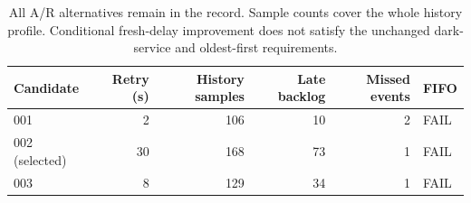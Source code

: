 \begin{table}[htbp]
\centering\small
\begin{tabular}{@{}lrrrrl@{}}
\toprule
Candidate & Retry (s) & History samples & Late backlog & Missed events & FIFO \\
\midrule

001 & 2 & 106 & 10 & 2 & FAIL \\

002 (selected) & 30 & 168 & 73 & 1 & FAIL \\

003 & 8 & 129 & 34 & 1 & FAIL \\

\bottomrule
\end{tabular}
\caption{All A/R alternatives remain in the record. Sample counts cover the whole history profile. Conditional fresh-delay improvement does not satisfy the unchanged dark-service and oldest-first requirements.}\label{tab:ar}
\end{table}
